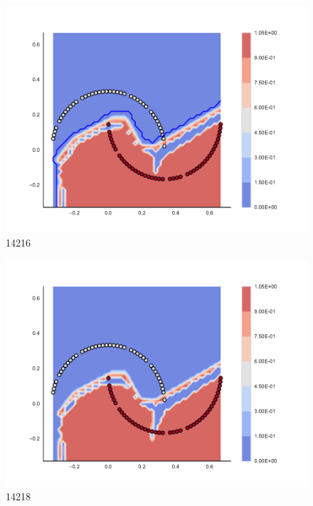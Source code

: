 \begin{subfigure}[b]{0.09\textwidth}
    \includegraphics[clip, trim=2.35cm 1.75cm 4.5cm 0cm,width=\textwidth]{img/convergence/14216.pdf}
    \caption{14216}
    \label{fig:convergence_14216}
\end{subfigure}
%
\begin{subfigure}[b]{0.09\textwidth}
    \includegraphics[clip, trim=2.35cm 1.75cm 4.5cm 0cm,width=\textwidth]{img/convergence/14218.pdf}
    \caption{14218}
    \label{fig:convergence_14218}
\end{subfigure}
%
